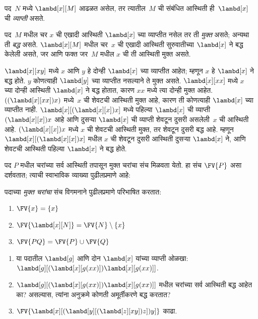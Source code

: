 \begin{defn}[व्याप्ती]
पद~$N$ मध्ये $\lambd[x][M]$ आढळत असेल, तर त्यातील~$M$
ची संबंधित आस्थिती ही~$\lambd[x]$ ची
\emph{व्याप्ती} असते.
\end{defn}


\begin{defn}[मुक्त आणि बद्ध आस्थिती]
  पद~$M$ मधील चर $x$ ची एखादी आस्थिती $\lambd[x]$ च्या
  व्याप्तीत नसेल तर ती \emph{मुक्त} असते; अन्यथा ती
  \emph{बद्ध} असते. $\lambd[x][M]$ मधील चर~$x$ ची
  एखादी आस्थिती सुरुवातीच्या $\lambd[x]$ ने बद्ध केलेली
  असते, जर आणि फक्त जर~$M$ मधील $x$ ची ती आस्थिती मुक्त असते.
\end{defn}

\begin{ex}
  $\lambd[x][x y]$ मध्ये $x$ आणि $y$ हे दोन्ही $\lambd[x]$
  च्या व्याप्तीत आहेत; म्हणून $x$ हे $\lambd[x]$ ने बद्ध होते.
  $y$ कोणत्याही $\lambd[y]$ च्या व्याप्तीत नसल्याने ते मुक्त
  असते. $\lambd[x][x x]$ मध्ये $x$ च्या दोन्ही आस्थिती
  $\lambd[x]$ ने बद्ध होतात, कारण $xx$ मध्ये त्या दोन्ही मुक्त
  आहेत. $((\lambd[x][xx])x)$ मध्ये~$x$ ची शेवटची आस्थिती
  मुक्त आहे, कारण ती कोणत्याही $\lambd[x]$ च्या व्याप्तीत नाही.
  $\lambd[x][(\lambd[x][x])x]$ मध्ये पहिल्या $\lambd[x]$
  ची व्याप्ती $(\lambd[x][x])x$ आहे आणि दुसऱ्या $\lambd[x]$
  ची व्याप्ती शेवटून दुसरी असलेली~$x$ ची आस्थिती आहे.
  $(\lambd[x][x])x$ मध्ये $x$ ची शेवटची आस्थिती मुक्त,
  तर शेवटून दुसरी बद्ध आहे. म्हणून
  $\lambd[x][(\lambd[x][x])x]$ मधील $x$ ची शेवटून दुसरी
  आस्थिती दुसऱ्या $\lambd[x]$ ने, आणि शेवटची आस्थिती
  पहिल्या $\lambd[x]$ ने बद्ध होते.
\end{ex}

पद $P$ मधील चरांच्या सर्व आस्थिती तपासून मुक्त चरांचा संच
मिळवता येतो. हा संच $\FV{P}$ असा दर्शवतात; त्याची
स्वाभाविक व्याख्या पुढीलप्रमाणे आहे:

\begin{defn}[पदाचे मुक्त चरे] \label{lam:syn:fv:def:fv}
  पदाच्या \emph{मुक्त चरांचा} संच विगमनाने पुढीलप्रमाणे परिभाषित करतात:
  \begin{enumerate}
    \item $\FV{x} = \{x\}$ \label{lam:syn:fv:def:fv1}
    \item $\FV{\lambd[x][N]} = \FV{N} \setminus \{x\}$ \label{lam:syn:fv:def:fv2}
    \item $\FV{PQ} = \FV{P} \cup \FV{Q}$ \label{lam:syn:fv:def:fv3}
  \end{enumerate}
\end{defn}

\begin{prob}
  \begin{enumerate}
  \item या पदातील $\lambd[g]$ आणि दोन $\lambd[x]$ यांच्या
    व्याप्ती ओळखा: $\lambd[g][(\lambd[x][g (x x)]) \lambd[x][g (x x)]]$.
  \item $\lambd[g][(\lambd[x][g (x x)]) \lambd[x][g (x x)]]$
    मधील चरांच्या सर्व आस्थिती बद्ध आहेत का? असल्यास,
    त्यांना अनुक्रमे कोणती अमूर्तीकरणे बद्ध करतात?
    \item $\FV{\lambd[x][(\lambd[y][(\lambd[z][x y]) z]) y]}$
      काढा.
  \end{enumerate}
\end{prob}

